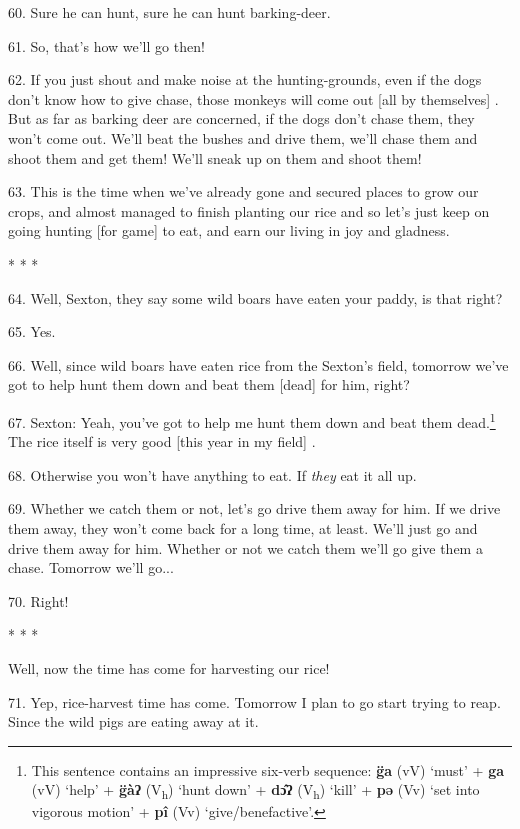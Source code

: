 60. Sure he can hunt, sure he can hunt barking-deer.

61. So, that's how we'll go then!

62. If you just shout and make noise at the hunting-grounds, even if the dogs don't
know how to give chase, those monkeys will come out [all by themselves] . But as
far as barking deer are concerned, if the dogs don't chase them, they won't come
out. We'll beat the bushes and drive them, we'll chase them and shoot them and
get them! We'll sneak up on them and shoot them!

63. This is the time when we've already gone and secured places to grow our crops,
and almost managed to finish planting our rice and so let's just keep on going
hunting [for game] to eat, and earn our living in joy and gladness.

\begin{center}
* * *
\end{center}

64. Well, Sexton, they say some wild boars have eaten your paddy, is that right?

65. Yes.

66. Well, since wild boars have eaten rice from the Sexton's field, tomorrow we've
got to help hunt them down and beat them [dead] for him, right?

67. Sexton: Yeah, you've got to help me hunt them down and beat them dead.\footnote{This sentence contains an impressive six-verb sequence: \textbf{g̈a} (vV) `must' + \textbf{ga} (vV) `help' + \textbf{g̈àʔ} (V\textsubscript{h}) `hunt down' + \textbf{dɔ̂ʔ} (V\textsubscript{h}) `kill' + \textbf{pə} (Vv) `set into vigorous motion' + \textbf{pî} (Vv) `give/benefactive'.}
The rice itself is very good [this year in my field] .

68. Otherwise you won't have anything to eat. If \textit{they} eat it all up.

69. Whether we catch them or not, let's go drive them away for him. If we drive
them away, they won't come back for a long time, at least. We'll just go and drive
them away for him. Whether or not we catch them we'll go give them a chase. Tomorrow
we'll go...

70. Right!

\begin{center}
* * *
\end{center}

Well, now the time has come for harvesting our rice!

71. Yep, rice-harvest time has come. Tomorrow I plan to go start trying to reap.
Since the wild pigs are eating away at it.

